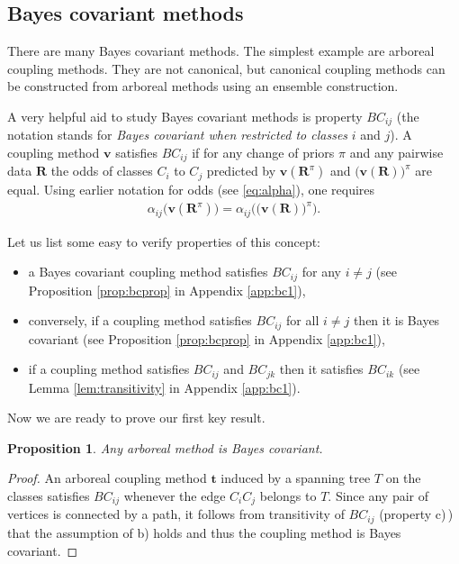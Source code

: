 \documentclass[pdflatex, sn-basic]{sn-jnl}%
\newtheorem{prop}{Proposition}
\theoremstyle{thmstyleone}%
\theoremstyle{thmstyletwo}%
\theoremstyle{thmstylethree}%
\begin{document}
\subsection{Bayes covariant methods} \label{sec:bc2}

There are many Bayes covariant methods. The simplest example are arboreal coupling methods. They are not canonical, but canonical coupling methods can be constructed from arboreal methods using an ensemble construction. 

A very helpful aid to study Bayes covariant methods is property $BC_{ij}$ (the notation stands for \emph{Bayes covariant when restricted to classes} $i$ and $j$). A coupling method $\boldsymbol{v}$ satisfies $BC_{ij}$ if for any change of priors $\pi$ and any  pairwise data $\boldsymbol{R}$ the odds of classes $C_i$ to $C_j$ predicted by $\boldsymbol{v}(\boldsymbol{R}^\pi)$ and $\bigl(\boldsymbol{v}(\boldsymbol{R})\bigr)^\pi$ are equal. Using earlier notation for odds (see \eqref{eq:alpha}), one requires
\begin{align}
	\alpha_{ij} \bigl(\boldsymbol{v}(\boldsymbol{R}^\pi) \bigr) = \alpha_{ij}\biggl( \bigl(\boldsymbol{v}(\boldsymbol{R}) \bigr)^\pi\biggr).
\end{align}

Let us list some easy to verify properties of this concept:

\begin{itemize}
	\item[(a)] a Bayes covariant coupling method satisfies $BC_{ij}$ for any $i\not= j$ (see Proposition \ref{prop:bcprop} in Appendix \ref{app:bc1}),
	\item[(b)] conversely, if a coupling method satisfies $BC_{ij}$ for all $i\not= j$ then it is Bayes covariant (see Proposition \ref{prop:bcprop} in Appendix \ref{app:bc1}),
	\item[(c)] if a coupling method satisfies $BC_{ij}$ and $BC_{jk}$ then it satisfies $BC_{ik}$ (see Lemma \ref{lem:transitivity} in Appendix \ref{app:bc1}).
\end{itemize}

Now we are ready to prove  our first key result.

\begin{prop}
Any arboreal method is Bayes covariant.
\end{prop}
\begin{proof}

An arboreal coupling method $\boldsymbol{t}$ induced by a spanning tree $T$ on the classes satisfies $BC_{ij}$ whenever the edge $C_iC_j$ belongs to $T$. Since any pair of vertices is connected by a path, it follows from transitivity of $BC_{ij}$ (property c)\,) that the assumption of b) holds and thus the coupling method is Bayes covariant.
	
\end{proof}
\end{document}

